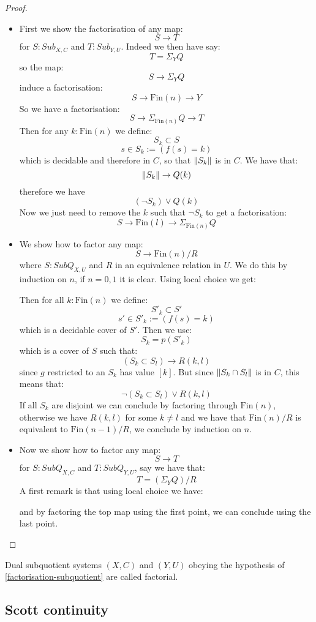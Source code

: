 \begin{proof}
\begin{itemize}
\item First we show the factorisation of any map:
\[S\to T\]
for $S:Sub_{X,C}$ and $T:Sub_{Y,U}$. Indeed we then have say:
\[T = \Sigma_YQ\]
so the map:
\[S\to \Sigma_YQ\]
induce a factorisation:
\[S\to \mathrm{Fin}(n) \to Y\]
So we have a factorisation:
\[S\to \Sigma_{\mathrm{Fin}(n)} Q \to T\]
Then for any $k:\mathrm{Fin}(n)$ we define:
\[S_k \subset S\]
\[s\in S_k := (f(s) = k)\]
which is decidable and therefore in $C$, so that $\lVert S_k \rVert$ is in $C$. We have that:
\[\lVert S_k \rVert \to Q(k)\]
therefore we have
\[(\neg S_k) \lor Q(k)\]
Now we just need to remove the $k$ such that $\neg S_k$ to get a factorisation:
\[S\to \mathrm{Fin}(l) \to \Sigma_{\mathrm{Fin}(n)}Q\]
\item We show how to factor any map:
\[S\to \mathrm{Fin}(n)/R\]
where $S:SubQ_{X,U}$ and $R$ in an equivalence relation in $U$. We do this by induction on $n$, if $n=0,1$ it is clear. Using local choice we get:
\begin{center}
\end{center}
Then for all $k:\mathrm{Fin}(n)$ we define:
\[S'_k \subset S'\]
\[s'\in S'_k := (f(s) = k)\]
which is a decidable cover of $S'$. Then we use:
\[S_k = p(S'_k)\]
which is a cover of $S$ such that:
\[(S_k\subset S_l) \to R(k,l)\]
since $g$ restricted to an $S_k$ has value $[k]$. But since $\lVert S_k\cap S_l \rVert$ is in $C$, this means that:
\[\neg(S_k\subset S_l) \lor R(k,l)\]
If all $S_k$ are disjoint we can conclude by factoring through $\mathrm{Fin}(n)$, otherwise we have $R(k,l)$ for some $k\not=l$ and we have that $\mathrm{Fin}(n)/R$ is equivalent to $\mathrm{Fin}(n-1)/R$, we conclude by induction on $n$.
\item  Now we show how to factor any map:
\[S\to T\]
for $S:SubQ_{X,C}$ and $T:SubQ_{Y,U}$, say we have that:
\[T = (\Sigma_YQ)/R\]
A first remark is that using local choice we have:
\begin{center}
\end{center}
and by factoring the top map using the first point, we can conclude using the last point.
\end{itemize}
\end{proof}

\begin{definition}
Dual subquotient systems $(X,C)$ and $(Y,U)$ obeying the hypothesis of \cref{factorisation-subquotient} are called factorial.
\end{definition}

\subsection{Scott continuity}

